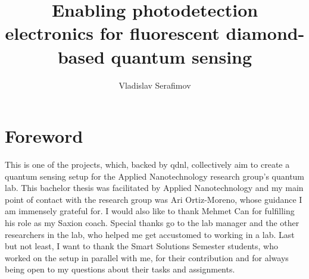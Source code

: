 \documentclass{report}
\title{Enabling photodetection electronics for 
	fluorescent diamond-based quantum sensing}
\author{Vladislav Serafimov}
\begin{document}
	\maketitle
	
	
	
	\tableofcontents
	\chapter{Foreword}
	This is one of the projects, which, backed by \gls{qdnl}, collectively aim to create a quantum sensing setup for the Applied Nanotechnology research group's quantum lab. This bachelor thesis was facilitated by Applied Nanotechnology and my main point of contact with the research group was Ari Ortiz-Moreno, whose guidance I am immensely grateful for. I would also like to thank Mehmet Can for fulfilling his role as my Saxion coach. Special thanks go to the lab manager and the other researchers in the lab, who helped me get accustomed to working in a lab. Last but not least, I want to thank the Smart Solutions Semester students, who worked on the setup in parallel with me, for their contribution and for always being open to my questions about their tasks and assignments.
	
	
\end{document}
